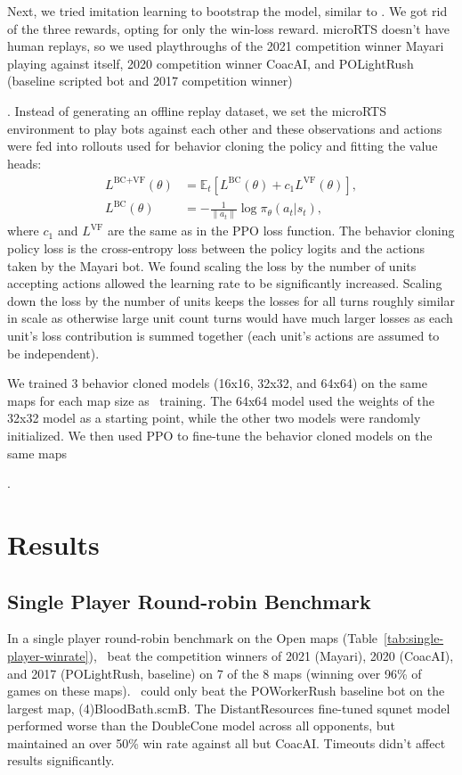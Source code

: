 \documentclass[conference]{IEEEtran}
\newif\ifsupplemental
\newcommand{\supptableref}[1]{%
  \ifsupplemental
    \ (Supplemental Table~\ref{#1})%
  \fi
}
\newcommand{\mapname}[1]{#1} %
\newcounter{supptable}
\begin{document}
Next, we tried imitation learning to bootstrap the model, similar to
\cite{Vinyals2019GrandmasterLI}. We got rid of the three rewards, opting for only the
win-loss reward. microRTS doesn't have human replays, so we used playthroughs of the
2021 competition winner Mayari playing against itself, 2020 competition winner CoacAI, 
and POLightRush (baseline scripted bot and 2017 competition
winner)\supptableref{tab:bc-training-parameters}.
Instead of generating an offline replay dataset, we set the microRTS environment to play bots
against each other and these observations and actions were fed into rollouts used for
behavior cloning the policy and fitting the value heads:
\begin{align}
    L^{\text{BC+VF}}(\theta) &= \hat{\mathbb{E}}_t \left[ L^{\text{BC}}(\theta) + c_1 L^{\text{VF}}(\theta) \right], \\
    L^{\text{BC}}(\theta) &= -\frac{1}{\|a_t\|} \log \pi_{\theta}(a_t|s_t),
\end{align}
where $c_1$ and $L^{\text{VF}}$ are the same as in the PPO loss function. The behavior cloning
policy loss is the cross-entropy loss between the policy logits and the actions taken by
the Mayari bot. We found scaling the loss by the number of units accepting actions
allowed the learning rate to be significantly increased. Scaling down the loss by the
number of units keeps the losses for all turns roughly similar in scale as otherwise
large unit count turns would have much larger losses as each unit's loss contribution is
summed together (each unit's actions are assumed to be independent).

We trained 3 behavior cloned models (16x16, 32x32, and 64x64) on the same maps for each
map size as \agentName\ training. The 64x64 model used the weights of the 32x32 model 
as a starting point, while the other two models were randomly initialized. We then used 
PPO to fine-tune the behavior cloned models on the same maps\supptableref{tab:bc-ppo-training-parameters}.

\section{Results}
\subsection{Single Player Round-robin Benchmark}
\label{sec:single-player-benchmark}
In a single player round-robin benchmark on the Open maps (Table~\ref{tab:single-player-winrate}), \agentName\
beat the competition winners of 2021 (Mayari), 2020 (CoacAI), and 2017 (POLightRush,
baseline) on 7 of the 8 maps (winning over 96\% of games on these maps). \agentName\
could only beat the POWorkerRush baseline bot on the largest map,
\mapname{(4)BloodBath.scmB}. The DistantResources fine-tuned squnet model performed worse than the DoubleCone model
across all opponents, but maintained an over 50\% win rate against all but CoacAI. Timeouts didn't affect results significantly.
\end{document}
